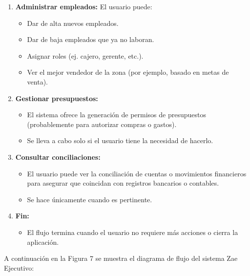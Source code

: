 \documentclass[protocolo.tex]{subfiles}
\begin{document}
\begin{enumerate}
\begin{itemize}
        
    \end{itemize}
    \item \textbf{Administrar empleados:}
    El usuario puede:
    \begin{itemize}
        \item Dar de alta nuevos empleados.
        \item Dar de baja empleados que ya no laboran.
        \item Asignar roles (ej. cajero, gerente, etc.).
        \item Ver el mejor vendedor de la zona (por ejemplo, basado en metas de venta).
        

    \end{itemize}
    \item \textbf{Gestionar presupuestos:} 
   \begin{itemize}
        \item El sistema ofrece la generación de permisos de presupuestos (probablemente para autorizar compras o gastos).
        \item Se lleva a cabo solo si el usuario tiene la necesidad de hacerlo.

    \end{itemize}
    \item \textbf{Consultar conciliaciones:}
    \begin{itemize}
        \item El usuario puede ver la conciliación de cuentas o movimientos financieros para asegurar que coincidan con registros bancarios o contables.
        \item Se hace únicamente cuando es pertinente.

    \end{itemize}
    \item \textbf{Fin:}  
    \begin{itemize}
        \item El flujo termina cuando el usuario no requiere más acciones o cierra la aplicación.
    \end{itemize}
\end{enumerate}

A continuación en la Figura 7 se muestra el diagrama de flujo del sistema Zae Ejecutivo:\vspace{4mm}
\end{document}
